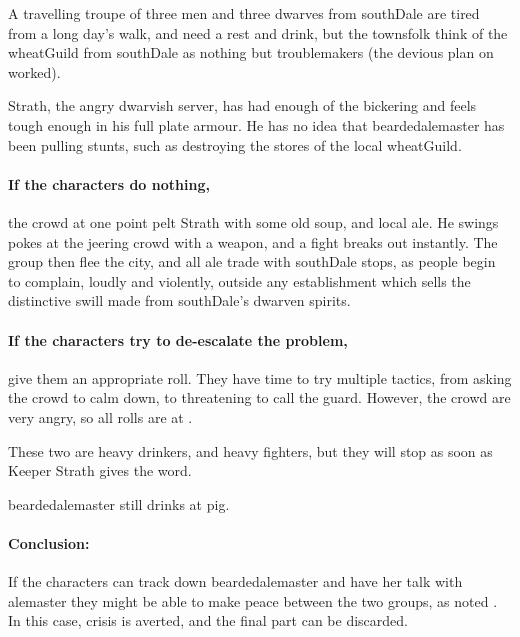 A travelling troupe of three men and three dwarves from \gls{southDale} are tired from a long day's walk, and need a rest and drink, but the townsfolk think of the \gls{wheatGuild} from \gls{southDale} as nothing but troublemakers (the devious plan on  worked).

Strath, the angry dwarvish \gls{server}, has had enough of the bickering and feels tough enough in his full plate armour.
He has no idea that \gls{beardedalemaster} has been pulling stunts, such as destroying the stores of the local \gls{wheatGuild}.

\paragraph{If the characters do nothing,}
the crowd at one point pelt Strath with some old soup, and local ale.
He swings pokes at the jeering crowd with a weapon, and a fight breaks out instantly.
The group then flee the city, and all ale trade with \gls{southDale} stops, as people begin to complain, loudly and violently, outside any establishment which sells the distinctive swill made from \gls{southDale}'s dwarven spirits.

\paragraph{If the characters try to de-escalate the problem,}
give them an appropriate roll.
They have time to try multiple tactics, from asking the crowd to calm down, to threatening to call the guard.
However, the crowd are very angry, so all rolls are at \tn[10].



These two are heavy drinkers, and heavy fighters, but they will stop as soon as Keeper Strath gives the word.


\Gls{beardedalemaster} still drinks at \gls{pig}.  

\paragraph{Conclusion:} If the characters can track down \gls{beardedalemaster} and have her talk with \gls{alemaster} they might be able to make peace between the two groups, as noted .
In this case, crisis is averted, and the final part can be discarded.

